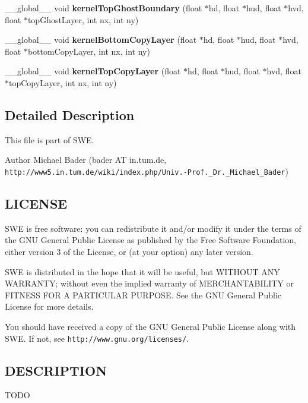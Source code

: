 \begin{DoxyCompactItemize}
\item 
\-\_\-\-\_\-global\-\_\-\-\_\- void {\bfseries kernel\-Top\-Ghost\-Boundary} (float $\ast$hd, float $\ast$hud, float $\ast$hvd, float $\ast$top\-Ghost\-Layer, int nx, int ny)\label{SWE__BlockCUDA__kernels_8hh_a7cf7164d51b1b16664556c25dd675a46}

\item 
\-\_\-\-\_\-global\-\_\-\-\_\- void {\bfseries kernel\-Bottom\-Copy\-Layer} (float $\ast$hd, float $\ast$hud, float $\ast$hvd, float $\ast$bottom\-Copy\-Layer, int nx, int ny)\label{SWE__BlockCUDA__kernels_8hh_af1a79800b1a5fca1daaeded30541769b}

\item 
\-\_\-\-\_\-global\-\_\-\-\_\- void {\bfseries kernel\-Top\-Copy\-Layer} (float $\ast$hd, float $\ast$hud, float $\ast$hvd, float $\ast$top\-Copy\-Layer, int nx, int ny)\label{SWE__BlockCUDA__kernels_8hh_a48b8d7d4d3bf3c69a289df057f4b6f3e}

\end{DoxyCompactItemize}


\subsection{Detailed Description}
This file is part of S\-W\-E.

\begin{DoxyAuthor}{Author}
Michael Bader (bader A\-T in.\-tum.\-de, {\tt http\-://www5.\-in.\-tum.\-de/wiki/index.\-php/\-Univ.-\/\-Prof.\-\_\-\-Dr.\-\_\-\-Michael\-\_\-\-Bader})
\end{DoxyAuthor}
\subsection{L\-I\-C\-E\-N\-S\-E}\label{Writer_8hh_LICENSE}
S\-W\-E is free software\-: you can redistribute it and/or modify it under the terms of the G\-N\-U General Public License as published by the Free Software Foundation, either version 3 of the License, or (at your option) any later version.

S\-W\-E is distributed in the hope that it will be useful, but W\-I\-T\-H\-O\-U\-T A\-N\-Y W\-A\-R\-R\-A\-N\-T\-Y; without even the implied warranty of M\-E\-R\-C\-H\-A\-N\-T\-A\-B\-I\-L\-I\-T\-Y or F\-I\-T\-N\-E\-S\-S F\-O\-R A P\-A\-R\-T\-I\-C\-U\-L\-A\-R P\-U\-R\-P\-O\-S\-E. See the G\-N\-U General Public License for more details.

You should have received a copy of the G\-N\-U General Public License along with S\-W\-E. If not, see {\tt http\-://www.\-gnu.\-org/licenses/}.\subsection{D\-E\-S\-C\-R\-I\-P\-T\-I\-O\-N}\label{NetCdfWriter_8hh_DESCRIPTION}
T\-O\-D\-O 